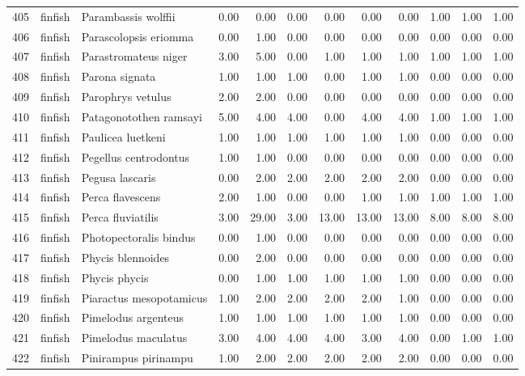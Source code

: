 \begin{table}[ht]
\begin{tabular}{rllrrrrrrrrr}
  405 & finfish & Parambassis wolffii & 0.00 & 0.00 & 0.00 & 0.00 & 0.00 & 0.00 & 1.00 & 1.00 & 1.00 \\ 
  406 & finfish & Parascolopsis eriomma & 0.00 & 1.00 & 0.00 & 0.00 & 0.00 & 0.00 & 0.00 & 0.00 & 0.00 \\ 
  407 & finfish & Parastromateus niger & 3.00 & 5.00 & 0.00 & 1.00 & 1.00 & 1.00 & 1.00 & 1.00 & 1.00 \\ 
  408 & finfish & Parona signata & 1.00 & 1.00 & 1.00 & 0.00 & 1.00 & 1.00 & 0.00 & 0.00 & 0.00 \\ 
  409 & finfish & Parophrys vetulus & 2.00 & 2.00 & 0.00 & 0.00 & 0.00 & 0.00 & 0.00 & 0.00 & 0.00 \\ 
  410 & finfish & Patagonotothen ramsayi & 5.00 & 4.00 & 4.00 & 0.00 & 4.00 & 4.00 & 1.00 & 1.00 & 1.00 \\ 
  411 & finfish & Paulicea luetkeni & 1.00 & 1.00 & 1.00 & 1.00 & 1.00 & 1.00 & 0.00 & 0.00 & 0.00 \\ 
  412 & finfish & Pegellus centrodontus & 1.00 & 1.00 & 0.00 & 0.00 & 0.00 & 0.00 & 0.00 & 0.00 & 0.00 \\ 
  413 & finfish & Pegusa lascaris & 0.00 & 2.00 & 2.00 & 2.00 & 2.00 & 2.00 & 0.00 & 0.00 & 0.00 \\ 
  414 & finfish & Perca flavescens & 2.00 & 1.00 & 0.00 & 0.00 & 1.00 & 1.00 & 1.00 & 1.00 & 1.00 \\ 
  415 & finfish & Perca fluviatilis & 3.00 & 29.00 & 3.00 & 13.00 & 13.00 & 13.00 & 8.00 & 8.00 & 8.00 \\ 
  416 & finfish & Photopectoralis bindus & 0.00 & 1.00 & 0.00 & 0.00 & 0.00 & 0.00 & 0.00 & 0.00 & 0.00 \\ 
  417 & finfish & Phycis blennoides & 0.00 & 2.00 & 0.00 & 0.00 & 0.00 & 0.00 & 0.00 & 0.00 & 0.00 \\ 
  418 & finfish & Phycis phycis & 0.00 & 1.00 & 1.00 & 1.00 & 1.00 & 1.00 & 0.00 & 0.00 & 0.00 \\ 
  419 & finfish & Piaractus mesopotamicus & 1.00 & 2.00 & 2.00 & 2.00 & 2.00 & 1.00 & 0.00 & 0.00 & 0.00 \\ 
  420 & finfish & Pimelodus argenteus & 1.00 & 1.00 & 1.00 & 1.00 & 1.00 & 1.00 & 0.00 & 0.00 & 0.00 \\ 
  421 & finfish & Pimelodus maculatus & 3.00 & 4.00 & 4.00 & 4.00 & 3.00 & 4.00 & 0.00 & 1.00 & 1.00 \\ 
  422 & finfish & Pinirampus pirinampu & 1.00 & 2.00 & 2.00 & 2.00 & 2.00 & 2.00 & 0.00 & 0.00 & 0.00 \\ 

\end{tabular}
\end{table}

